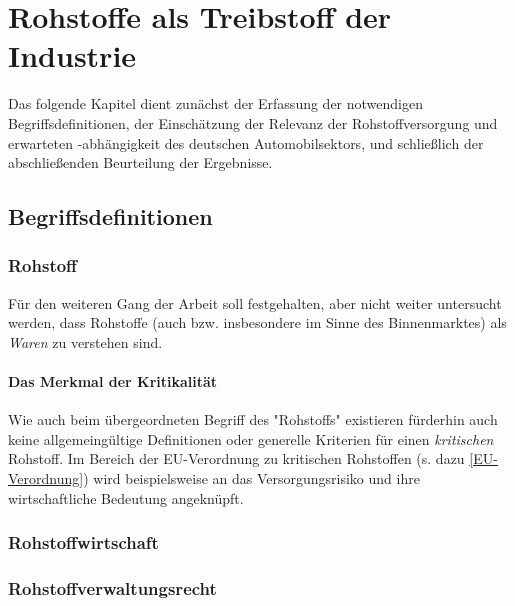 \documentclass[12pt,a4paper,oneside]{book} %
\begin{document}
	
	
	\chapter{Rohstoffe als Treibstoff der Industrie}
	
	Das folgende Kapitel dient zunächst der Erfassung der notwendigen Begriffsdefinitionen, der Einschätzung der Relevanz der Rohstoffversorgung und erwarteten -abhängigkeit des deutschen Automobilsektors, und schließlich der abschließenden Beurteilung der Ergebnisse.
	
	\section{Begriffsdefinitionen}
	
	\subsection{Rohstoff}
	
	
	
	
	
	Für den weiteren Gang der Arbeit soll festgehalten, aber nicht weiter untersucht werden, dass Rohstoffe (auch bzw. insbesondere im Sinne des Binnenmarktes) als \textit{Waren} zu verstehen sind.\autocite{Schorkopf, Rohstoffverwaltung, Rn. 6ff.}
	
	
	\subsubsection{Das Merkmal der Kritikalität}
	Wie auch beim übergeordneten Begriff des "Rohstoffs" existieren fürderhin auch keine allgemeingültige Definitionen oder generelle Kriterien für einen \textit{kritischen} Rohstoff. Im Bereich der EU-Verordnung zu kritischen Rohstoffen (s. dazu \ref{EU-Verordnung}) wird beispielsweise an das Versorgungsrisiko und ihre wirtschaftliche Bedeutung angeknüpft.
	
	\subsection{Rohstoffwirtschaft}
	
	\subsection{Rohstoffverwaltungsrecht}
	
\end{document}
